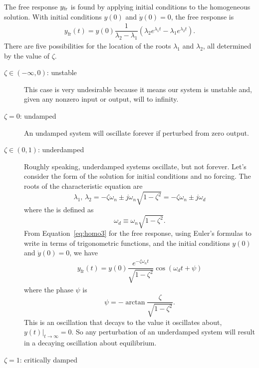 \documentclass[dynamic_systems.tex]{subfiles}
\begin{document}
The free response $y_\textnormal{fr}$ is found by applying initial conditions to the homogeneous solution. 
With initial conditions $y(0)$ and $\dot{y}(0) = 0$, the free response is
\tags{}
\begin{align}\label{eq:homo3}
	y_\text{fr}(t) = y(0) \dfrac{1}{\lambda_2-\lambda_1} 
	\left(
		\lambda_2 e^{\lambda_1 t} -
		\lambda_1 e^{\lambda_2 t}
	\right).
\end{align}
There are five possibilities for the location of the roots $\lambda_1$ and $\lambda_2$, all determined by the value of $\zeta$.
\begin{description}
	\item[$\zeta \in (-\infty,0)$: unstable]
		This case is very undesirable because it means our system is unstable and, given any nonzero input or output, will  to infinity.
	\item[$\zeta = 0$: undamped]
		An undamped system will oscillate forever if perturbed from zero output.
	\item[$\zeta \in (0,1)$: underdamped]
		Roughly speaking, underdamped systems oscillate, but not forever.
		Let's consider the form of the solution for initial conditions and no forcing. 
		The roots of the characteristic equation are
		\begin{equation}
			\lambda_1 \text{, } \lambda_2 = -\zeta \omega_n \pm j \omega_n \sqrt{1 - \zeta^2} = -\zeta \omega_n \pm j \omega_d
		\end{equation}
		where the  is defined as
		\begin{equation}
			\omega_d \equiv \omega_n \sqrt{1-\zeta^2}.
		\end{equation}
		From Equation~\eqref{eq:homo3} for the free response, using Euler's formulas to write in terms of trigonometric functions, and the initial conditions $y(0)$ and $\dot{y}(0) = 0$, we have
		\begin{align}\label{eq:underdamped_response}
			y_\text{fr}(t) = y(0) \dfrac{e^{-\zeta \omega_n t}}{\sqrt{1-\zeta^2}} \cos (\omega_d t + \psi)
		\end{align}
		where the phase $\psi$ is
		\begin{equation}
			\psi =  -\arctan\dfrac{\zeta}{\sqrt{1-\zeta^2}}.
		\end{equation}
		This is an oscillation that decays to the value it oscillates about, $y(t)|_{t\rightarrow\infty}=0$.
		So any perturbation of an underdamped system will result in a decaying oscillation about equilibrium.
	\item[$\zeta = 1$: critically damped]

\end{description}
\end{document}
